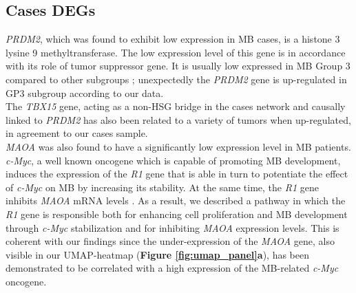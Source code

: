 \documentclass[10pt]{SelfArx} %
\begin{document}
\subsection{Cases DEGs}\label{sec:cases_DE}
\textit{PRDM2}, which was found to exhibit low expression in MB cases, is a histone 3 lysine 9 methyltransferase. The low expression level of this gene is in accordance with its role of tumor suppressor gene. It is usually low expressed in MB Group 3 compared to other subgroups \cite{stripay2019medu}; unexpectedly the \textit{PRDM2} gene is up-regulated in GP3 subgroup according to our data.\\
The \textit{TBX15} gene, acting as a non-HSG bridge in the cases network and causally linked to \textit{PRDM2} has also been related to a variety of tumors \cite{yan2023overexpression} when up-regulated, in agreement to our cases sample.\\
\textit{MAOA} was also found to have a significantly low expression level in MB patients. \textit{c-Myc}, a well known oncogene which is capable of promoting MB development, induces the expression of the \textit{R1} gene that is able in turn to potentiate the effect of \textit{c-Myc} on MB by increasing its stability. At the same time, the \textit{R1} gene inhibits \textit{MAOA} mRNA levels \cite{ou2006monoamine}. As a result, we described a pathway in which the \textit{R1} gene is responsible both for enhancing cell proliferation and MB development through \textit{c-Myc} stabilization and for inhibiting \textit{MAOA} expression levels. This is coherent with our findings since the under-expression of the \textit{MAOA} gene, also visible in our UMAP-heatmap (\textbf{Figure \ref{fig:umap_panel}a}), has been demonstrated to be correlated with a high expression of the MB-related \textit{c-Myc} oncogene.\\
\end{document}
